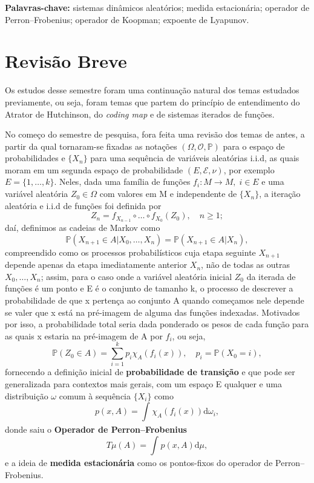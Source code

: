 \documentclass[12pt, a4paper]{article}
\theoremstyle{definition}
\begin{document}
\noindent\textbf{Palavras-chave:} sistemas dinâmicos aleatórios; medida estacionária; operador de Perron--Frobenius; operador de Koopman; expoente de Lyapunov.

\newpage
\section*{Revisão Breve}
Os estudos desse semestre foram uma continuação natural dos temas estudados previamente, ou seja, foram temas que partem do princípio de entendimento do Atrator de Hutchinson, do \textit{coding map} e de sistemas iterados de funções.

No começo do semestre de pesquisa, fora feita uma revisão dos temas de antes, a partir da qual tornaram-se fixadas as notações \((\Omega , \mathcal{O}, \mathbb{P})\) para o espaço de probabilidades e \(\{X_{n}\}\) para uma sequência de variáveis aleatórias i.i.d, as quais moram em um segunda espaço de probabilidade \((E, \mathcal{E}, \nu)\), por exemplo \(E=\{1,\dotsc ,k\}\).
Neles, dada uma família de funções \(f_{i}:M\rightarrow M, \; i\in E\) e uma variável aleatória \(Z_{0}\in \Omega \) com valores em M e independente de \(\{X_{n}\}\), a iteração aleatória e i.i.d de funções foi definida por
\[
	Z_{n}=f_{X_{n-1}}\circ \dotsc \circ f_{X_{0}}(Z_{0}),\quad n\geq 1;
\]
daí, definimos as cadeias de Markov como
\[
	\mathbb{P}(X_{n+1}\in A| X_{0},\dotsc , X_{n})=\mathbb{P}(X_{n+1}\in A | X_{n}),
\]
compreendido como os processos probabilísticos cuja etapa seguinte \(X_{n+1}\) depende apenas da etapa imediatamente anterior \(X_{n}\), não de todas as outras \(X_{0},\dotsc ,X_{n}\); assim, para o caso onde a variável aleatória inicial \(Z_{0}\) da iterada de funções é um ponto e E é o conjunto de tamanho k, o processo de descrever a probabilidade de que x pertença ao conjunto A quando começamos nele depende se valer que x está na pré-imagem de alguma das funções indexadas.
Motivados por isso, a probabilidade total seria dada ponderado os pesos de cada função para as quais x estaria na pré-imagem de A por \(f_{i}\), ou seja,
\[
	\mathbb{P}(Z_{0}\in A) = \sum\limits_{i=1}^{k}p_{i}\chi_{A}(f_{i}(x)),\quad p_{i}= \mathbb{P}(X_{0}=i),
\]
fornecendo a definição inicial de \textbf{probabilidade de transição} e que pode ser generalizada para contextos mais gerais, com um espaço E qualquer e uma distribuição \(\omega \) comum à sequência \(\{X_{i}\}\) como
\[
	p(x, A)= \int_{}\chi_{A}(f_{i}(x)) \mathrm{d}\omega_{i},
\]
donde saiu o \textbf{Operador de Perron--Frobenius}
\[
	T\mu (A)=\int_{}^{}p(x, A) \mathrm{d}\mu,
\]
e a ideia de \textbf{medida estacionária} como os pontos-fixos do operador de Perron--Frobenius.
\end{document}

